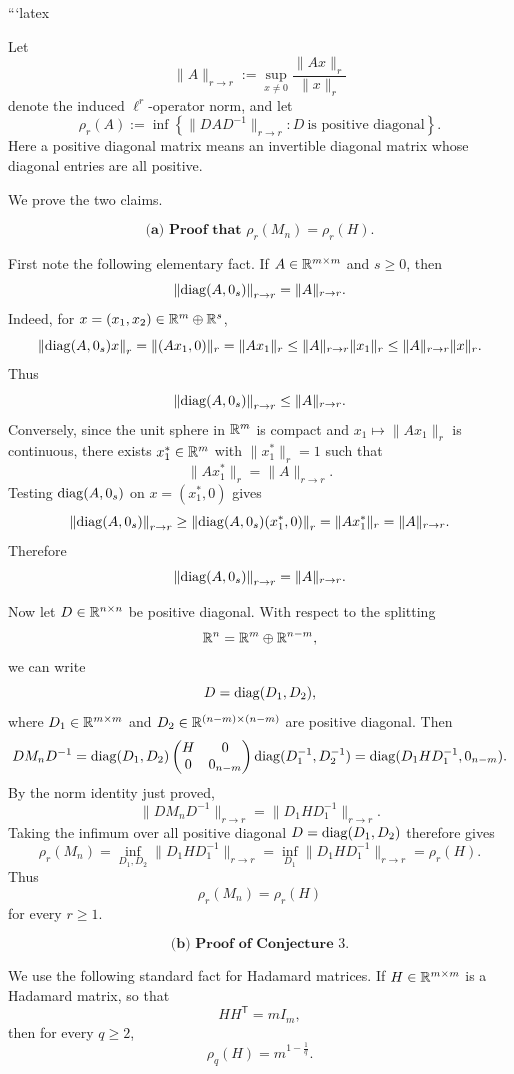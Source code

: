 ```latex
\[
\newcommand{\R}{\mathbb{R}}
\newcommand{\diag}{\operatorname{diag}}
\]

Let
\[
\|A\|_{r\to r}:=\sup_{x\neq 0}\frac{\|Ax\|_r}{\|x\|_r}
\]
denote the induced \(\ell^r\)-operator norm, and let
\[
\rho_r(A):=\inf\left\{\|DAD^{-1}\|_{r\to r}:D\ \text{is positive diagonal}\right\}.
\]
Here a positive diagonal matrix means an invertible diagonal matrix whose diagonal entries are all positive.

We prove the two claims.

\[
\textbf{(a) Proof that }\rho_r(M_n)=\rho_r(H).
\]

First note the following elementary fact. If \(A\in \R^{m\times m}\) and \(s\geq 0\), then
\[
\left\|\diag(A,0_s)\right\|_{r\to r}=\|A\|_{r\to r}.
\]
Indeed, for \(x=(x_1,x_2)\in \R^m\oplus \R^s\),
\[
\left\|\diag(A,0_s)x\right\|_r
=
\|(Ax_1,0)\|_r
=
\|Ax_1\|_r
\leq
\|A\|_{r\to r}\|x_1\|_r
\leq
\|A\|_{r\to r}\|x\|_r.
\]
Thus
\[
\left\|\diag(A,0_s)\right\|_{r\to r}\leq \|A\|_{r\to r}.
\]
Conversely, since the unit sphere in \(\R^m\) is compact and \(x_1\mapsto \|Ax_1\|_r\) is continuous, there exists \(x_1^\ast\in \R^m\) with \(\|x_1^\ast\|_r=1\) such that
\[
\|Ax_1^\ast\|_r=\|A\|_{r\to r}.
\]
Testing \(\diag(A,0_s)\) on \(x=(x_1^\ast,0)\) gives
\[
\left\|\diag(A,0_s)\right\|_{r\to r}
\geq
\left\|\diag(A,0_s)(x_1^\ast,0)\right\|_r
=
\|Ax_1^\ast\|_r
=
\|A\|_{r\to r}.
\]
Therefore
\[
\left\|\diag(A,0_s)\right\|_{r\to r}=\|A\|_{r\to r}.
\]

Now let \(D\in \R^{n\times n}\) be positive diagonal. With respect to the splitting
\[
\R^n=\R^m\oplus \R^{n-m},
\]
we can write
\[
D=\diag(D_1,D_2),
\]
where \(D_1\in \R^{m\times m}\) and \(D_2\in \R^{(n-m)\times(n-m)}\) are positive diagonal. Then
\[
D M_n D^{-1}
=
\diag(D_1,D_2)
\begin{pmatrix}
H&0\\
0&0_{n-m}
\end{pmatrix}
\diag(D_1^{-1},D_2^{-1})
=
\diag(D_1HD_1^{-1},0_{n-m}).
\]
By the norm identity just proved,
\[
\|D M_n D^{-1}\|_{r\to r}
=
\|D_1HD_1^{-1}\|_{r\to r}.
\]
Taking the infimum over all positive diagonal \(D=\diag(D_1,D_2)\) therefore gives
\[
\rho_r(M_n)
=
\inf_{D_1,D_2}\|D_1HD_1^{-1}\|_{r\to r}
=
\inf_{D_1}\|D_1HD_1^{-1}\|_{r\to r}
=
\rho_r(H).
\]
Thus
\[
\boxed{\rho_r(M_n)=\rho_r(H)}
\]
for every \(r\geq 1\).

\[
\textbf{(b) Proof of Conjecture }3.
\]

We use the following standard fact for Hadamard matrices. If \(H\in \R^{m\times m}\) is a Hadamard matrix, so that
\[
HH^{\mathsf T}=mI_m,
\]
then for every \(q\geq 2\),
\[
\rho_q(H)=m^{1-\frac1q}.
\]

